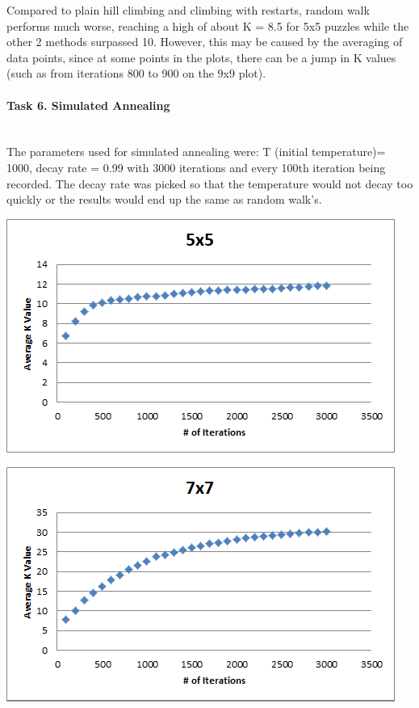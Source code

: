 \documentclass[12pt, letterpaper]{article}
\begin{document}
Compared to plain hill climbing and climbing with restarts, random walk performs much worse, reaching a high of about K = 8.5 for 5x5 puzzles while the other 2 methods surpassed 10. However, this may be caused by the averaging of data points, since at some points in the plots, there can be a jump in K values (such as from iterations 800 to 900 on the 9x9 plot).

\pagebreak
\paragraph{Task 6. Simulated Annealing} \mbox{}\\

The parameters used for simulated annealing were: T (initial temperature)= 1000, decay rate = 0.99 with 3000 iterations and every 100th iteration being recorded. The decay rate was picked so that the temperature would not decay too quickly or the results would end up the same as random walk's.

\includegraphics[width=\linewidth]{"Task 6/5x5 Scatterplot"}

\includegraphics[width=\linewidth]{"Task 6/7x7 Scatterplot"}
\end{document}
